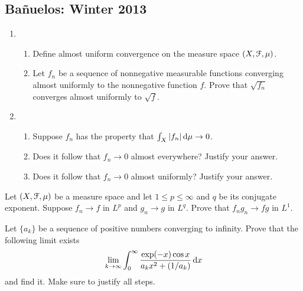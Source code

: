 \subsection{Bañuelos: Winter 2013}
\setcounter{exercise}{0}
\setcounter{equation}{0}
\begin{problem}
  \hfill
  \begin{enumerate}[label=(\alph*)]
  \item \hfill
    \begin{enumerate}[label=(\roman*),noitemsep]
    \item Define almost uniform convergence on the measure space
      $(X,\mathcal{F},\mu)$.
    \item Let $f_n$ be a sequence of nonnegative measurable functions
      converging almost uniformly to the nonnegative function $f$. Prove
      that $\sqrt{f_n}$ converges almost uniformly to $\sqrt{f}$.
    \end{enumerate}
  \item \hfill
    \begin{enumerate}[label=(\roman*),noitemsep]
    \item Suppose $f_n$ has the property that $\int_X |f_n|\mathop{}\!\mathrm{d}\mu\to 0$.
    \item Does it follow that $f_n\to 0$ almost everywhere? Justify your
      answer.
    \item Does it follow that $f_n\to 0$ almost uniformly? Justify your
      answer.
    \end{enumerate}
  \end{enumerate}
\end{problem}
\begin{solution}
\end{solution}

\begin{problem}
  Let $(X,\mathcal{F},\mu)$ be a measure space and let $1\leq p\leq\infty$ and
  $q$ be its conjugate exponent. Suppose $f_n\to f$ in $L^p$ and $g_n\to g$
  in $L^q$. Prove that $f_ng_n\to fg$ in $L^1$.
\end{problem}
\begin{solution}
\end{solution}

\begin{problem}
  Let $\{a_k\}$ be a sequence of positive numbers converging to
  infinity. Prove that the following limit exists
  \[
    \lim_{k\to\infty}\int_0^\infty\frac{\exp(-x)\cos
      x}{a_kx^2+(1/a_k)}\mathop{}\!\mathrm{d} x
  \]
  and find it. Make sure to justify all steps.
\end{problem}
\begin{solution}
\end{solution}

